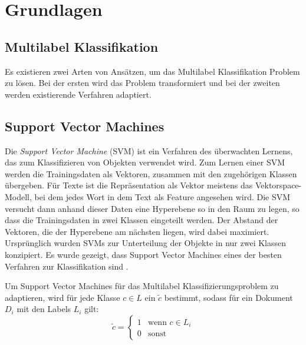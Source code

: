 \section{Grundlagen}
\subsection{Multilabel Klassifikation}
\label{sub:multilabel_klassifikation}
Es existieren zwei Arten von Ansätzen, um das Multilabel Klassifikation Problem zu lösen.
Bei der ersten wird das Problem transformiert und bei der zweiten werden existierende Verfahren adaptiert.

\subsection{Support Vector Machines}
\label{sub:support_vector_machines}
Die \emph{Support Vector Machine} (SVM) ist ein Verfahren des überwachten Lernens, das zum Klassifizieren von Objekten verwendet wird.
Zum Lernen einer SVM werden die Trainingsdaten als Vektoren, zusammen mit den zugehörigen Klassen übergeben.
Für Texte ist die Repräsentation als Vektor meistens das Vektorspace-Modell, bei dem jedes Wort in dem Text als Feature angesehen wird.
Die SVM versucht dann anhand dieser Daten eine Hyperebene so in den Raum zu legen, so dass die Trainingsdaten in zwei Klassen eingeteilt werden.
Der Abstand der Vektoren, die der Hyperebene am nächsten liegen, wird dabei maximiert.
Ursprünglich wurden SVMs zur Unterteilung der Objekte in nur zwei Klassen konzipiert.
Es wurde gezeigt, dass Support Vector Machines eines der besten Verfahren zur Klassifikation sind \cite{Joachims:1998:TCS:645326.649721}.





Um Support Vector Machines für das Multilabel Klassifizierungsproblem zu adaptieren, wird für jede Klasse $c \in L$ ein $\tilde c$ bestimmt, sodass für ein Dokument $D_i$ mit den Labels $L_i$ gilt:
\[
    \tilde c =
    \begin{cases}
        1 &\mbox{wenn } c \in L_i \\
        0 &\mbox{sonst}
    \end{cases}
\]

